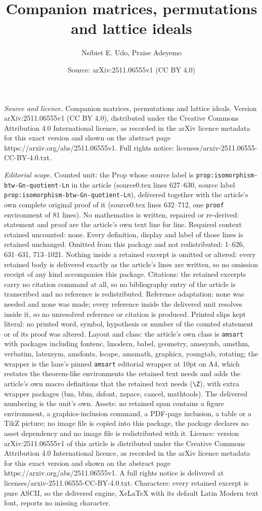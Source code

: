 \documentclass[10pt,a4paper]{amsart}
\title[Companion matrices, permutations and lattice ideals]{Companion matrices, permutations and lattice ideals}
\author{Nsibiet E. Udo, Praise Adeyemo}
\date{Source: arXiv:2511.06555v1 (CC BY 4.0)}
\begin{document}
\maketitle

\noindent\emph{Source and licence.} Companion matrices, permutations and lattice ideals. Version arXiv:2511.06555v1 (CC BY 4.0), distributed under the Creative Commons Attribution 4.0 International licence, as recorded in the arXiv licence metadata for this exact version and shown on the abstract page https://arxiv.org/abs/2511.06555v1. Full rights notice: licenses/arxiv-2511.06555-CC-BY-4.0.txt.\par\smallskip

\noindent\textit{Editorial scope.} Counted unit: the Prop whose source label is \texttt{prop:isomorphism-btw-Gn-quotient-Ln} in the article (source0.tex lines 627--630, source label \texttt{prop:isomorphism-btw-Gn-quotient-Ln}), delivered together with the article's own complete original proof of it (source0.tex lines 632--712, one \texttt{proof} environment of 81 lines). No mathematics is written, repaired or re-derived: statement and proof are the article's own text line for line. Required context retained uncounted: none. Every definition, display and label of those lines is retained unchanged. Omitted from this package and not redistributed: 1--626, 631--631, 713--1021. Nothing inside a retained excerpt is omitted or altered: every retained body is delivered exactly as the article's lines are written, so no omission receipt of any kind accompanies this package. Citations: the retained excerpts carry no citation command at all, so no bibliography entry of the article is transcribed and no reference is redistributed. Reference adaptation: none was needed and none was made; every reference inside the delivered unit resolves inside it, so no unresolved reference or citation is produced. Printed slips kept literal: no printed word, symbol, hypothesis or number of the counted statement or of its proof was altered. Layout and class: the article's own class is \texttt{amsart} with packages including fontenc, lmodern, babel, geometry, amssymb, amsthm, verbatim, latexsym, amsfonts, lscape, amsmath, graphicx, youngtab, rotating; the wrapper is the lane's pinned \texttt{amsart} editorial wrapper at 10pt on A4, which restates the theorem-like environments the retained text needs and adds the article's own macro definitions that the retained text needs (\texttt{\textbackslash Z}), with extra wrapper packages (bm, bbm, dsfont, xspace, cancel, mathtools). The delivered numbering is the unit's own. Assets: no retained span contains a figure environment, a graphics-inclusion command, a PDF-page inclusion, a table or a TikZ picture; no image file is copied into this package, the package declares no asset dependency and no image file is redistributed with it. Licence: version arXiv:2511.06555v1 of this article is distributed under the Creative Commons Attribution 4.0 International licence, as recorded in the arXiv licence metadata for this exact version and shown on the abstract page https://arxiv.org/abs/2511.06555v1. A full rights notice is delivered at licenses/arxiv-2511.06555-CC-BY-4.0.txt. Characters: every retained excerpt is pure ASCII, so the delivered engine, XeLaTeX with its default Latin Modern text font, reports no missing character.
\end{document}
